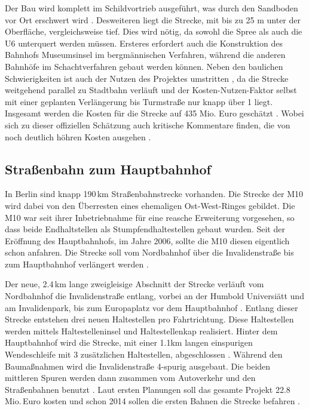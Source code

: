 Der Bau wird komplett im Schildvortrieb ausgeführt, was durch den Sandboden vor
Ort erschwert wird \cite{bkhU5}. Desweiteren liegt die Strecke, mit bis zu 25 m unter der Oberfläche,
vergleichsweise tief. Dies wird nötig, da sowohl die Spree als auch die U6
unterquert werden müssen. Ersteres erfordert auch die Konstruktion des Bahnhofs
Museumsinsel im bergmännischen Verfahren, während die anderen Bahnhöfe im
Schachtverfahren gebaut werden können. Neben den baulichen Schwierigkeiten ist
auch der Nutzen des Projektes umstritten \cite{ftdU5}, da die Strecke weitgehend
parallel zu Stadtbahn verläuft und der Kosten-Nutzen-Faktor selbst mit einer geplanten Verlängerung bis Turmstraße
nur knapp über 1 liegt. Insgesamt werden die Kosten für die Strecke auf 435
Mio. Euro geschätzt \cite{bwwwU5}. Wobei sich zu dieser offiziellen Schätzung
auch kritische Kommentare finden, die von noch deutlich höhren Kosten ausgehen
\cite{ftdU5}.

\subsection*{Straßenbahn zum Hauptbahnhof}

In Berlin sind knapp 190\,km Straßenbahnstrecke vorhanden. Die Strecke
der M10 wird dabei von den Überresten eines ehemaligen Ost-West-Ringes
gebildet. Die M10 war seit ihrer Inbetriebnahme für eine reasche
Erweiterung vorgesehen, so dass beide Endhaltstellen als
Stumpfendhaltestellen gebaut wurden. Seit der Eröffnung des
Hauptbahnhofs, im Jahre 2006, sollte die M10 diesen eigentlich schon anfahren. Die Strecke soll vom Nordbahnhof über die
Invalidenstraße bis zum Hauptbahnhof verlängert
werden \cite{tsM10}.

Der neue, 2.4\,km lange zweigleisige Abschnitt der Strecke verläuft vom
Nordbahnhof die Invalidenstraße entlang, vorbei an der Humbold
Universiätt und am Invalidenpark, bis zum Europaplatz vor dem
Hauptbahnhof \cite{M10bInfo}. Entlang dieser Strecke entstehen
drei neuen Haltestellen pro Fahrtrichtung. Diese Haltestellen werden
mittels Haltestelleninsel und Haltestellenkap realisiert. Hinter dem
Hauptbahnhof wird die Strecke, mit einer 1.1km langen einspurigen
Wendeschleife mit 3 zusätzlichen Haltestellen, abgeschlossen
\cite{zdfM10}. Während den Baumaßnahmen wird die Invalidenstraße
4-spurig ausgebaut. Die beiden mittleren Spuren werden dann zusammen
vom Autoverkehr und den Straßenbahnen benutzt
\cite{flyerInvalidestr}. Laut ersten Planungen soll das gesamte
Projekt 22.8\,Mio.\,Euro kosten und schon 2014 sollen die ersten
Bahnen die Strecke befahren \cite{mopoM10}.


